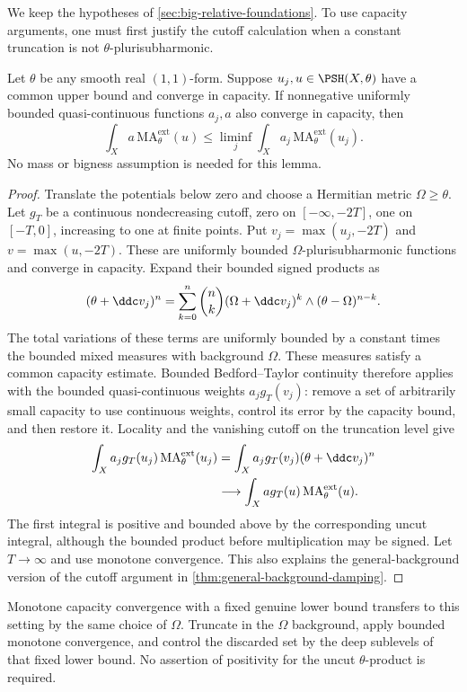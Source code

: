 We keep the hypotheses of \cref{sec:big-relative-foundations}. To use capacity arguments, one must first justify the cutoff calculation when a constant truncation is not $\theta$-plurisubharmonic.

\begin{lemma}\label{lem:big-weighted-lsc}
Let $\theta$ be any smooth real $(1,1)$-form. Suppose $u_j,u\in\PSH(X,\theta)$ have a common upper bound and converge in capacity. If nonnegative uniformly bounded quasi-continuous functions $a_j,a$ also converge in capacity, then
\[
 \int_Xa\,\mathrm{MA}^{\mathrm{ext}}_\theta(u)
 \leq\liminf_j\int_Xa_j\,\mathrm{MA}^{\mathrm{ext}}_\theta(u_j).
\]
No mass or bigness assumption is needed for this lemma.
\end{lemma}
\begin{proof}
Translate the potentials below zero and choose a Hermitian metric $\Omega\geq\theta$. Let $g_T$ be a continuous nondecreasing cutoff, zero on $[-\infty,-2T]$, one on $[-T,0]$, increasing to one at finite points. Put $v_j=\max(u_j,-2T)$ and $v=\max(u,-2T)$. These are uniformly bounded $\Omega$-plurisubharmonic functions and converge in capacity. Expand their bounded signed products as
\[
 (\theta+\ddc v_j)^n
 =\sum_{k=0}^n\binom nk
       (\Omega+\ddc v_j)^k\wedge(\theta-\Omega)^{n-k}.
\]
The total variations of these terms are uniformly bounded by a constant times the bounded mixed measures with background $\Omega$. These measures satisfy a common capacity estimate. Bounded Bedford--Taylor continuity therefore applies with the bounded quasi-continuous weights $a_jg_T(v_j)$: remove a set of arbitrarily small capacity to use continuous weights, control its error by the capacity bound, and then restore it. Locality and the vanishing cutoff on the truncation level give
\[
 \begin{split}
 \int_Xa_jg_T(u_j)\,\mathrm{MA}^{\mathrm{ext}}_\theta(u_j)
 &=\int_Xa_jg_T(v_j)(\theta+\ddc v_j)^n\\
 &\longrightarrow
 \int_Xag_T(u)\,\mathrm{MA}^{\mathrm{ext}}_\theta(u).
 \end{split}
\]
The first integral is positive and bounded above by the corresponding uncut integral, although the bounded product before multiplication may be signed. Let $T\to\infty$ and use monotone convergence. This also explains the general-background version of the cutoff argument in \cref{thm:general-background-damping}.
\end{proof}

Monotone capacity convergence with a fixed genuine lower bound transfers to this setting by the same choice of $\Omega$. Truncate in the $\Omega$ background, apply bounded monotone convergence, and control the discarded set by the deep sublevels of that fixed lower bound. No assertion of positivity for the uncut $\theta$-product is required.

